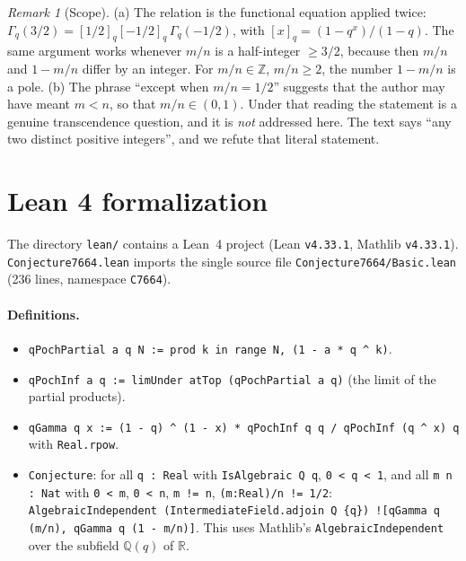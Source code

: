 \documentclass[11pt]{article}
\theoremstyle{definition}
\theoremstyle{remark}
\newtheorem{remark}[theorem]{Remark}
\renewcommand{\_}{\oldus\allowbreak}
\begin{document}
\begin{remark}[Scope]
(a) The relation is the functional equation applied twice:
$\Gamma_q(3/2) = [1/2]_q[-1/2]_q\,\Gamma_q(-1/2)$, with $[x]_q = (1-q^x)/(1-q)$. The same
argument works whenever $m/n$ is a half-integer $\ge 3/2$, because then $m/n$ and $1-m/n$ differ by an
integer. For $m/n \in \mathbb{Z}$, $m/n \ge 2$, the number $1 - m/n$ is a pole.
(b) The phrase ``except when $m/n = 1/2$'' suggests that the author may have meant $m < n$, so that
$m/n \in (0,1)$. Under that reading the statement is a genuine transcendence question, and it is
\emph{not} addressed here. The text says ``any two distinct positive integers'', and we refute that
literal statement.
\end{remark}

\section{Lean 4 formalization}

The directory \texttt{lean/} contains a Lean~4 project (Lean \texttt{v4.33.1}, Mathlib \texttt{v4.33.1}).
\texttt{Conjecture7664.lean} imports the single source file \texttt{Conjecture7664/Basic.lean}
(236 lines, namespace \texttt{C7664}).

\paragraph{Definitions.}
\begin{itemize}[leftmargin=*]
  \item \texttt{qPochPartial a q N := prod k in range N, (1 - a * q \^{} k)}.
  \item \texttt{qPochInf a q := limUnder atTop (qPochPartial a q)} (the limit of the partial products).
  \item \texttt{qGamma q x := (1 - q) \^{} (1 - x) * qPochInf q q / qPochInf (q \^{} x) q} with
        \texttt{Real.rpow}.
  \item \texttt{Conjecture}: for all \texttt{q : Real} with \texttt{IsAlgebraic Q q}, \texttt{0 < q < 1},
        and all \texttt{m n : Nat} with \texttt{0 < m}, \texttt{0 < n}, \texttt{m != n},
        \texttt{(m:Real)/n != 1/2}:
        \texttt{AlgebraicIndependent (IntermediateField.adjoin Q \{q\}) ![qGamma q (m/n), qGamma q (1 - m/n)]}.
        This uses Mathlib's \texttt{AlgebraicIndependent} over the subfield $\mathbb{Q}(q)$ of $\mathbb{R}$.
\end{itemize}
\end{document}
